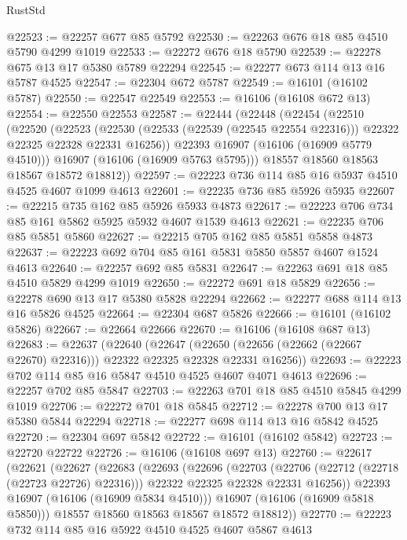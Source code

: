 \begin{lexlean}{RustStd}
\begin{coremodule}
@22523 := @22257 @677 @85 @5792
@22530 := @22263 @676 @18 @85 @4510 @5790 @4299 @1019
@22533 := @22272 @676 @18 @5790
@22539 := @22278 @675 @13 @17 @5380 @5789 @22294
@22545 := @22277 @673 @114 @13 @16 @5787 @4525
@22547 := @22304 @672 @5787
@22549 := @16101 (@16102 @5787)
@22550 := @22547 @22549
@22553 := @16106 (@16108 @672 @13)
@22554 := @22550 @22553
@22587 := @22444
    (@22448
      (@22454
        (@22510
          (@22520
            (@22523
              (@22530 (@22533 (@22539 (@22545 @22554 @22316))) @22322 @22325 @22328 @22331 @16256))
            @22393
            @16907
            (@16106 (@16909 @5779 @4510)))
          @16907
          (@16106 (@16909 @5763 @5795)))
        @18557
        @18560
        @18563
        @18567
        @18572
        @18812))
@22597 := @22223 @736 @114 @85 @16 @5937 @4510 @4525 @4607 @1099 @4613
@22601 := @22235 @736 @85 @5926 @5935
@22607 := @22215 @735 @162 @85 @5926 @5933 @4873
@22617 := @22223 @706 @734 @85 @161 @5862 @5925 @5932 @4607 @1539 @4613
@22621 := @22235 @706 @85 @5851 @5860
@22627 := @22215 @705 @162 @85 @5851 @5858 @4873
@22637 := @22223 @692 @704 @85 @161 @5831 @5850 @5857 @4607 @1524 @4613
@22640 := @22257 @692 @85 @5831
@22647 := @22263 @691 @18 @85 @4510 @5829 @4299 @1019
@22650 := @22272 @691 @18 @5829
@22656 := @22278 @690 @13 @17 @5380 @5828 @22294
@22662 := @22277 @688 @114 @13 @16 @5826 @4525
@22664 := @22304 @687 @5826
@22666 := @16101 (@16102 @5826)
@22667 := @22664 @22666
@22670 := @16106 (@16108 @687 @13)
@22683 := @22637
    (@22640
      (@22647 (@22650 (@22656 (@22662 (@22667 @22670) @22316))) @22322 @22325 @22328 @22331 @16256))
@22693 := @22223 @702 @114 @85 @16 @5847 @4510 @4525 @4607 @4071 @4613
@22696 := @22257 @702 @85 @5847
@22703 := @22263 @701 @18 @85 @4510 @5845 @4299 @1019
@22706 := @22272 @701 @18 @5845
@22712 := @22278 @700 @13 @17 @5380 @5844 @22294
@22718 := @22277 @698 @114 @13 @16 @5842 @4525
@22720 := @22304 @697 @5842
@22722 := @16101 (@16102 @5842)
@22723 := @22720 @22722
@22726 := @16106 (@16108 @697 @13)
@22760 := @22617
    (@22621
      (@22627
        (@22683
          (@22693
            (@22696
              (@22703
                (@22706 (@22712 (@22718 (@22723 @22726) @22316)))
                @22322
                @22325
                @22328
                @22331
                @16256))
            @22393
            @16907
            (@16106 (@16909 @5834 @4510)))
          @16907
          (@16106 (@16909 @5818 @5850)))
        @18557
        @18560
        @18563
        @18567
        @18572
        @18812))
@22770 := @22223 @732 @114 @85 @16 @5922 @4510 @4525 @4607 @5867 @4613

\end{coremodule}
\end{lexlean}
